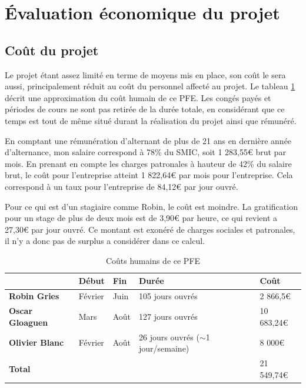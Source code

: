 \documentclass[openany, 11pt]{memoir}
\begin{document}
\newpage
\section{Évaluation économique du projet}

\subsection{Coût du projet}

Le projet étant assez limité en terme de moyens mis en place, son coût le sera aussi, principalement réduit au coût du personnel affecté au projet. Le tableau \ref{couts} décrit une approximation du coût humain de ce PFE. Les congés payés et périodes de cours ne sont pas retirée de la durée totale, en considérant que ce temps est tout de même situé durant la réalisation du projet ainsi que rémunéré.

\bigskip
En comptant une rémunération d'alternant de plus de 21 ans en dernière année d'alternance, mon salaire correspond à 78\% du SMIC, soit 1 283,55€ brut par mois. En prenant en compte les charges patronales à hauteur de 42\% du salaire brut, le coût pour l'entreprise atteint 1 822,64€ par mois pour l'entreprise.  Cela correspond à un taux pour l'entreprise de 84,12€ par jour ouvré.

Pour ce qui est d'un stagiaire comme Robin, le coût est moindre. La gratification pour un stage de plus de deux mois est de 3,90€ par heure, ce qui revient a 27,30€ par jour ouvré. Ce montant est exonéré de charges sociales et patronales, il n'y a donc pas de surplus a considérer dans ce calcul.

\begin{table}[ht]
	\centering
	\begin{tabular}{|l|l|l|l|l|}
		\hline
		& \textbf{Début} & \textbf{Fin} & \textbf{Durée} & \textbf{Coût} \\
		\hline
		\textbf{Robin Gries} & Février & Juin & 105 jours ouvrés & 2 866,5€ \\
		\hline
		\textbf{Oscar Gloaguen} & Mars & Août & 127 jours ouvrés & 10 683,24€ \\
		\hline
		\textbf{Olivier Blanc} & Février & Août & \makecell[l]{26 jours ouvrés \\ ($\sim$1 jour/semaine)} & 8 000€ \\
		\hline \hline
		\multicolumn{4}{|l|}{\textbf{Total}} & 21 549,74€  \\
		\hline
	\end{tabular}
	\caption{Coûts humains de ce PFE}
	\label{couts}
\end{table}
\end{document}
